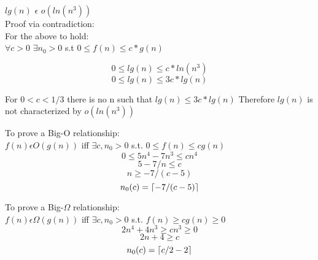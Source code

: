 \documentclass[12pt]{article}
\DeclarePairedDelimiter{\ceil}{\lceil}{\rceil}
\newenvironment{question}[2][Question]{\begin{trivlist}
		\item[\hskip \labelsep {\bfseries #1}\hskip \labelsep {\bfseries #2.}]}{\end{trivlist}}
\begin{document}
\begin{question}{4c}	
		$lg(n)$ $\epsilon$ $o(ln(n^3))$\\
		Proof via contradiction:\\
		
		For the above to hold:\\
		$\forall{c>0}$ $ \exists{n_0>0}$ s.t $ 0\leq f(n) \leq c*g(n)$
		
		$$0\leq lg(n) \leq c*ln(n^3)$$
		$$0\leq lg(n) \leq 3c*lg(n)$$
		
		For $0<c<1/3$ there is no n such that $lg(n) \leq 3c*lg(n)$
		Therefore 		$lg(n)$ is not characterized by $o(ln(n^3))$\\
		
			\end{question}
	
\begin{question}{5a}	
	
		To prove a Big-O relationship:\\
		$f(n) \epsilon O(g(n))$ iff $\exists{c, n_0 >0}$ s.t. $0 \leq f(n) \leq cg(n)$
		$$0 \leq 5n^4 - 7n^3 \leq cn^4$$
		$$5-7/n \leq c$$
		$$n\geq -7/(c-5)$$
		$$n_0(c)=\ceil{-7/(c-5)}$$

		
			\end{question}
	
\begin{question}{5b}
	To prove a Big-$\Omega$ relationship:\\
	
	$f(n) \epsilon \Omega(g(n))$ iff $\exists{c,n_0}>0$ s.t. $f(n) \geq cg(n) \geq 0$
	$$ 2n^4+4n^3 \geq cn^3 \geq 0$$
	$$2n+4 \geq c$$
	$$n_0(c)=\ceil{c/2-2}$$
	
			\end{question}
	
\end{document}
